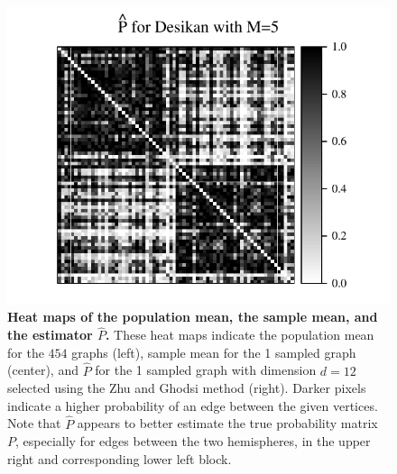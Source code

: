 \documentclass[simplex.tex]{subfiles}
\begin{document}
\begin{figure}[!h]
\begin{cframed}
\includegraphics[height=.205\textheight]{../../figs/Phat_desikan_m1.pdf}
\caption{{\bf Heat maps of the population mean, the sample mean, and the estimator $\hat{P}$.}
These heat maps indicate the population mean for the $454$ graphs (left), sample mean for the 1 sampled graph (center), and $\hat{P}$ for the 1 sampled graph with dimension $d=12$ selected using the Zhu and Ghodsi method (right).
Darker pixels indicate a higher probability of an edge between the given vertices.
Note that $\hat{P}$ appears to better estimate the true probability matrix $P$, especially for edges between the two hemispheres, in the upper right and corresponding lower left block.
}
\label{fig:Matrix_desikan_m1}
\end{cframed}
\end{figure}

\clearpage
\end{document}
